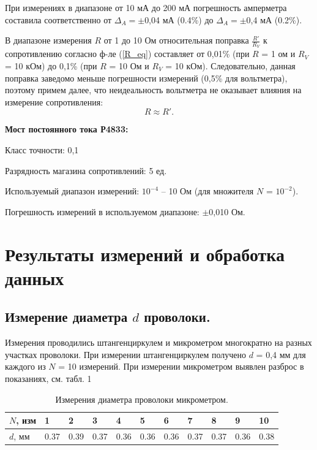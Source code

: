 \documentclass[12pt,a4paper]{article}
\begin{document}
При измерениях в диапазоне от 10 мА до 200 мА погрешность амперметра составила соответственно от $\Delta _{A} = \pm$0,04 мА (0.4\%) до $\Delta _{A} = \pm$0,4 мА (0.2\%).


В диапазоне измерения $R$ от 1 до 10 Ом относительная поправка $\frac{R'}{R_V}$ к сопротивлению согласно ф-ле (\ref{R_eq}) составляет от 0,01\% (при $R$ = 1 ом и $R_V$ = 10 кОм) до 0,1\% (при $R$ = 10 Ом и $R_V$ = 10 кОм). Следовательно, данная поправка заведомо меньше погрешности измерений (0,5\% для вольтметра), поэтому примем далее, что неидеальность вольтметра не оказывает влияния на измерение сопротивления:
\begin{equation}\label{Rarx_eq}
R \approx R'.
\end{equation}

{\bfseries Мост постоянного тока Р4833:}

\quad Класс точности: 0,1

\quad Разрядность магазина сопротивлений: 5 ед.

\quad Используемый диапазон измерений: $10^{-4}$ – 10 Ом (для множителя $N$ = $10^{-2}$).

\quad Погрешность измерений в используемом диапазоне: $\pm$0,010 Ом.

\section{ Результаты измерений и обработка данных}
\subsection{Измерение диаметра $d$ проволоки.}
Измерения проводились штангенциркулем и микрометром многократно на разных участках
проволоки. При измерении штангенциркулем получено $d$ = 0,4 мм для каждого из $N$ = 10
измерений. При измерении микрометром выявлен разброс в показаниях, см. табл. 1
\begin{table}[!ht]
    \label{tbl:d}
     \caption{\newline Измерения диаметра проволоки микрометром.
    }
    \centering
    \begin{tabular}{|l|l|l|l|l|l|l|l|l|l|l|}
    \hline
        $N$, изм & 1 & 2 & 3 & 4 & 5 & 6 & 7 & 8 & 9 & 10 \\ \hline
        $d$, мм & 0.37 & 0.39 & 0.37 & 0.36 & 0.36 & 0.36 & 0.37 & 0.37 & 0.36 & 0.38 \\ \hline
    \end{tabular}
\end{table}
\end{document}
